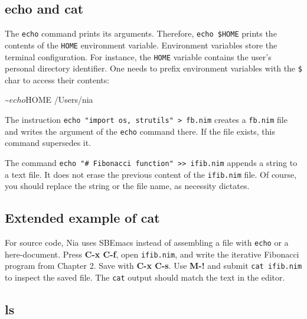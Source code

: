 \documentclass[
  12pt,
]{book}
\newenvironment{Shaded}{}{}
\newcommand{\NormalTok}[1]{#1}
\begin{document}
\subsection*{echo and cat}\label{echo}

The \texttt{echo} command prints its arguments. Therefore,
\texttt{echo\ \$HOME} prints the contents of the \texttt{HOME}
environment variable. Environment variables store the terminal
configuration. For instance, the \texttt{HOME} variable contains the
user's personal directory identifier. One needs to prefix environment
variables with the \texttt{\$} char to access their contents:

\begin{Shaded}
\begin{Highlighting}[]
\NormalTok{\textasciitilde{}$ echo $HOME}
\NormalTok{/Users/nia}
\end{Highlighting}
\end{Shaded}

The instruction
\texttt{echo\ "import\ os,\ strutils"\ \textgreater{}\ fb.nim} creates a
\texttt{fb.nim} file and writes the argument of the \texttt{echo}
command there. If the file exists, this command supersedes it.

The command
\texttt{echo\ "\#\ Fibonacci\ function"\ \textgreater{}\textgreater{}\ ifib.nim}
appends a string to a text file. It does not erase the previous content
of the \texttt{ifib.nim} file. Of course, you should replace the string
or the file name, as necessity dictates.

\subsection*{Extended example of cat}\label{Extended}

For source code, Nia uses SBEmacs instead of assembling a file with
\texttt{echo} or a here-document. Press \textbf{C-x C-f}, open
\texttt{ifib.nim}, and write the iterative Fibonacci program from
Chapter 2. Save with \textbf{C-x C-s}. Use \textbf{M-!} and submit
\texttt{cat\ ifib.nim} to inspect the saved file. The \texttt{cat}
output should match the text in the editor.

\subsection*{ls}\label{ls}
\end{document}
